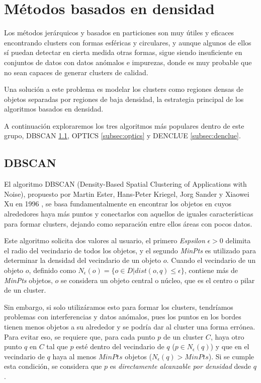 \documentclass[10pt, a4paper]{article}
\begin{document}
\section{Métodos basados en densidad} \label{sec:Métodos basados en densidad}


\cite{LIBRO} Los métodos jerárquicos y basados en particiones son muy útiles y eficaces encontrando clusters con formas esféricas y circulares, y aunque algunos de ellos sí puedan detectar en cierta medida otras formas, sigue siendo insuficiente en conjuntos de datos con datos anómalos e impurezas, donde es muy probable que no sean capaces de generar clusters de calidad.

Una solución a este problema es modelar los clusters como regiones densas de objetos separadas por regiones de baja densidad, la estrategia principal de los algoritmos basados en densidad. 

A continuación exploraremos los tres algoritmos más populares dentro de este grupo, DBSCAN \ref{subsec:dbscan}, OPTICS \ref{subsec:optics} y DENCLUE \ref{subsec:denclue}.



\subsection{\textbf{DBSCAN}} \label{subsec:dbscan}


El algoritmo DBSCAN (Density-Based Spatial Clustering of Applications with Noise), propuesto por Martin Ester, Hans-Peter Kriegel, Jorg Sander y Xiaowei Xu en 1996 \cite{DBSCAN}, se basa fundamentalmente en encontrar los objetos en cuyos alrededores haya más puntos y conectarlos con aquellos de iguales características para formar clusters, dejando como separación entre ellos áreas con pocos datos.

Este algoritmo solicita dos valores al usuario, el primero \textit{Espsilon} $\epsilon > 0$ delimita el radio del vecindario de todos los objetos, y el segundo \textit{MinPts} es utilizado para determinar la densidad del vecindario de un objeto $o$. Cuando el vecindario de un objeto $o$, definido como $N_{\epsilon}(o) = \{o \in D | dist(o,q) \leq \epsilon\}$, contiene más de \textit{MinPts} objetos, $o$ se considera un objeto central o núcleo, que es el centro o pilar de un cluster.

Sin embargo, si solo utilizáramos esto para formar los clusters, tendríamos problemas con interferencias y datos anómalos, pues los puntos en los bordes tienen menos objetos a su alrededor y se podría dar al cluster una forma errónea. Para evitar eso, se requiere que, para cada punto $p$ de un cluster $C$, haya otro punto $q$ en $C$ tal que $p$ esté dentro del vecindario de $q$ ($p  \in N_{\epsilon}(q)$) y que en el vecindario de $q$ haya al menos $MinPts$ objetos ($N_{\epsilon}(q) > MinPts$). Si se cumple esta condición, se considera que $p$ es \textit{directamente alcanzable por densidad} desde $q$.
\end{document}
